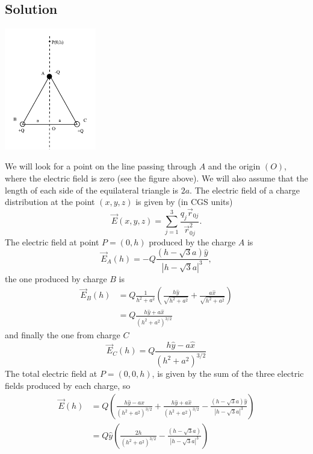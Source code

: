 \documentclass[solutions]{esg8022pset}
\begin{document}
\subsection{Solution}
  \begin{center}\includegraphics[width=0.3\textwidth]{ps01_sol_06}\end{center}
  We will look for a point on the line passing through $A$ and the origin $(O)$, where the electric field is zero (see the figure above). We will also assume that the length of each side of the equilateral triangle is $2a$. The electric field of a charge distribution at the point $(x, y, z)$ is given by (in CGS units)
  \begin{equation*}
    \vec E(x,y,z) = \sum_{j = 1}^3 \frac{q_j \vec r_{0j}}{\vec r_{0j}^2}.
  \end{equation*}
  The electric field at point $P = (0, h)$ produced by the charge $A$ is
  \begin{equation*}
    \vec E_A(h) = -Q\frac{(h - \sqrt3 a)\hat y}{|h - \sqrt3 a|^3},
  \end{equation*}
  the one produced by charge $B$ is
  \begin{align*}
    \vec E_B(h) & = Q\frac{1}{h^2 + a^2} \left(\frac{h\hat y}{\sqrt{h^2 + a^2}} + \frac{a\hat x}{\sqrt{h^2 + a^2}}\right) \\
                & = Q\frac{h\hat y + a\hat x}{(h^2 + a^2)^{3/2}}
  \end{align*}
  and finally the one from charge $C$
  \begin{equation*}
    \vec E_C(h) = Q\frac{h\hat y - a\hat x}{(h^2 + a^2)^{3/2}}
  \end{equation*}
  The total electric field at $P = (0, 0, h)$, is given by the sum of the three electric fields produced by each charge, so
  \begin{align*}
    \vec E(h) & = Q\left(\frac{h\hat y - a\hat x}{(h^2 + a^2)^{3/2}} + \frac{h\hat y + a\hat x}{(h^2 + a^2)^{3/2}} - \frac{(h - \sqrt3 a)\hat y}{|h - \sqrt3 a|^3}\right) \\
              & = Q\hat y\left(\frac{2h}{(h^2 + a^2)^{3/2}} - \frac{(h - \sqrt3 a)}{|h - \sqrt3 a|^3}\right)
  \end{align*}
\end{document}

